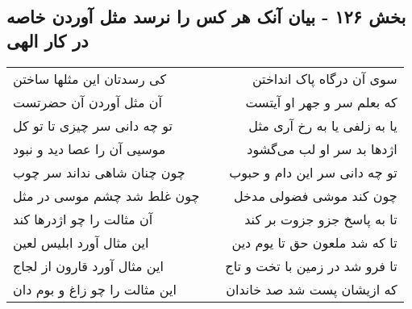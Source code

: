 \begin{center}
\section*{بخش ۱۲۶ - بیان آنک هر کس را نرسد مثل آوردن  خاصه در کار الهی}
\label{sec:sh126}
\begin{longtable}{l p{0.5cm} r}
کی رسدتان این مثلها ساختن
&&
سوی آن درگاه پاک انداختن
\\
آن مثل آوردن آن حضرتست
&&
که بعلم سر و جهر او آیتست
\\
تو چه دانی سر چیزی تا تو کل
&&
یا به زلفی یا به رخ آری مثل
\\
موسیی آن را عصا دید و نبود
&&
اژدها بد سر او لب می‌گشود
\\
چون چنان شاهی نداند سر چوب
&&
تو چه دانی سر این دام و حبوب
\\
چون غلط شد چشم موسی در مثل
&&
چون کند موشی فضولی مدخل
\\
آن مثالت را چو اژدرها کند
&&
تا به پاسخ جزو جزوت بر کند
\\
این مثال آورد ابلیس لعین
&&
تا که شد ملعون حق تا یوم دین
\\
این مثال آورد قارون از لجاج
&&
تا فرو شد در زمین با تخت و تاج
\\
این مثالت را چو زاغ و بوم دان
&&
که ازیشان پست شد صد خاندان
\\
\end{longtable}
\end{center}
